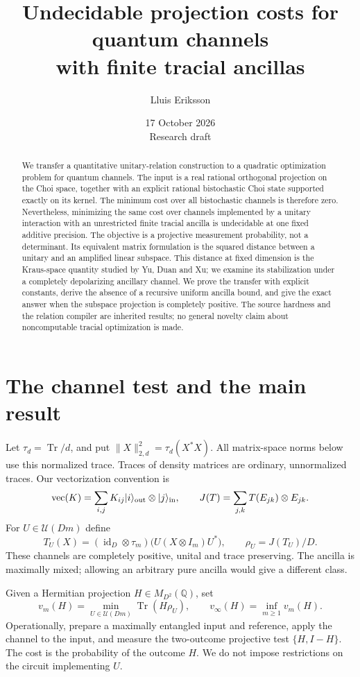 \documentclass[11pt,a4paper]{article}
\title{Undecidable projection costs for quantum channels\\with finite tracial ancillas}
\author{Lluis Eriksson}
\date{17 October 2026\\Research draft}
\newcommand{\Q}{\mathbb Q}
\newcommand{\Tr}{\operatorname{Tr}}
\newcommand{\id}{\operatorname{id}}
\newcommand{\vecop}{\operatorname{vec}}
\newcommand{\norm}[1]{\lVert#1\rVert}
\begin{document}
\maketitle
\begin{abstract}
We transfer a quantitative unitary-relation construction to a quadratic optimization problem for quantum channels. The input is a real rational orthogonal projection on the Choi space, together with an explicit rational bistochastic Choi state supported exactly on its kernel. The minimum cost over all bistochastic channels is therefore zero. Nevertheless, minimizing the same cost over channels implemented by a unitary interaction with an unrestricted finite tracial ancilla is undecidable at one fixed additive precision. The objective is a projective measurement probability, not a determinant. Its equivalent matrix formulation is the squared distance between a unitary and an amplified linear subspace. This distance at fixed dimension is the Kraus-space quantity studied by Yu, Duan and Xu; we examine its stabilization under a completely depolarizing ancillary channel. We prove the transfer with explicit constants, derive the absence of a recursive uniform ancilla bound, and give the exact answer when the subspace projection is completely positive. The source hardness and the relation compiler are inherited results; no general novelty claim about noncomputable tracial optimization is made.
\end{abstract}

\section{The channel test and the main result}
Let $\tau_d=\Tr/d$, and put $\norm X_{2,d}^2=\tau_d(X^*X)$. All matrix-space norms below use this normalized trace. Traces of density matrices are ordinary, unnormalized traces. Our vectorization convention is
\[
 \vecop(K)=\sum_{i,j}K_{ij}|i\rangle_{\rm out}\otimes|j\rangle_{\rm in},
 \qquad J(T)=\sum_{j,k}T(E_{jk})\otimes E_{jk}.
\]
For $U\in\mathcal U(Dm)$ define
\begin{equation}
 T_U(X)=(\id_D\otimes\tau_m)\bigl(U(X\otimes I_m)U^*\bigr),
 \qquad \rho_U=J(T_U)/D.                         \label{eq:channel}
\end{equation}
These channels are completely positive, unital and trace preserving. The ancilla is maximally mixed; allowing an arbitrary pure ancilla would give a different class.

Given a Hermitian projection $H\in M_{D^2}(\Q)$, set
\begin{equation}
 v_m(H)=\min_{U\in\mathcal U(Dm)}\Tr(H\rho_U),
 \qquad v_\infty(H)=\inf_{m\ge1}v_m(H).            \label{eq:value}
\end{equation}
Operationally, prepare a maximally entangled input and reference, apply the channel to the input, and measure the two-outcome projective test $\{H,I-H\}$. The cost is the probability of the outcome $H$. We do not impose restrictions on the circuit implementing $U$.
\end{document}
